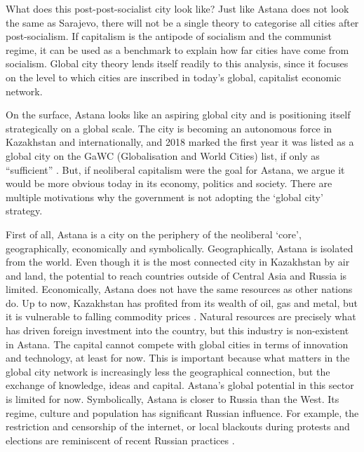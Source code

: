 \documentclass{article}
\begin{document}
What does this post-post-socialist city look like? Just like Astana does not look the same as Sarajevo, there will not be a single theory to categorise all cities after post-socialism. If capitalism is the antipode of socialism and the communist regime, it can be used as a benchmark to explain how far cities have come from socialism. Global city theory lends itself readily to this analysis, since it focuses on the level to which cities are inscribed in today's global, capitalist economic network.

On the surface, Astana looks like an aspiring global city and is positioning itself strategically on a global scale. The city is becoming an autonomous force in Kazakhstan and internationally, and 2018 marked the first year it was listed as a global city on the GaWC (Globalisation and World Cities) list, if only as ``sufficient'' \parencite{gawc2018list}. But, if neoliberal capitalism were the goal for Astana, we argue it would be more obvious today in its economy, politics and society. There are multiple motivations why the government is not adopting the `global city' strategy.

First of all, Astana is a city on the periphery of the neoliberal `core', geographically, economically and symbolically.  Geographically, Astana is isolated from the world. Even though it is the most connected city in Kazakhstan by air and land, the potential to reach countries outside of Central Asia and Russia is limited.
Economically, Astana does not have the same resources as other nations do. Up to now, Kazakhstan has profited from its wealth of oil, gas and metal, but it is vulnerable to falling commodity prices \parencite{batsaikhan2017central}. Natural resources are precisely what has driven foreign investment into the country, but this industry is non-existent in Astana. The capital cannot compete with global cities in terms of innovation and technology, at least for now. This is important because what matters in the global city network is increasingly less the geographical connection, but the exchange of knowledge, ideas and capital. Astana's global potential in this sector is limited for now.
Symbolically, Astana is closer to Russia than the West. Its regime, culture and population has significant Russian influence. For example, the restriction and censorship of the internet, or local blackouts during protests and elections are reminiscent of recent Russian practices \parencite{freedomhouse2021}.
\end{document}

